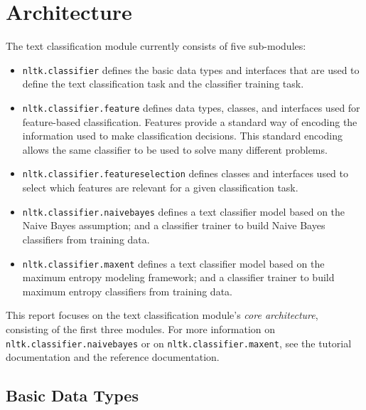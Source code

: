 \documentclass[12pt]{article}
\begin{document}
\section{Architecture}

  The text classification module currently consists of five
  sub-modules:

  \begin{itemize}

    \item \texttt{nltk.classifier} defines the basic data types and
    interfaces that are used to define the text classification task
    and the classifier training task.

    \item \texttt{nltk.classifier.feature} defines data types,
    classes, and interfaces used for feature-based classification.
    Features provide a standard way of encoding the information used
    to make classification decisions.  This standard encoding allows
    the same classifier to be used to solve many different problems.

    \item \texttt{nltk.classifier.featureselection} defines classes
    and interfaces used to select which features are relevant for a
    given classification task.

    \item \texttt{nltk.classifier.naivebayes} defines a text
    classifier model based on the Naive Bayes assumption; and a
    classifier trainer to build Naive Bayes classifiers from training
    data.

    \item \texttt{nltk.classifier.maxent} defines a text classifier
    model based on the maximum entropy modeling framework; and a
    classifier trainer to build maximum entropy classifiers from
    training data.

  \end{itemize}

  This report focuses on the text classification module's \emph{core
  architecture}, consisting of the first three modules.  For more
  information on \texttt{nltk.classifier.naivebayes} or on
  \texttt{nltk.classifier.maxent}, see the tutorial documentation and
  the reference documentation.

  \subsection{Basic Data Types}
\end{document}
